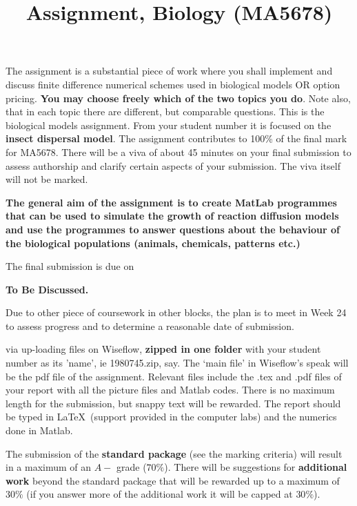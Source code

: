 \documentclass[12pt]{article}
\title{Assignment, Biology (MA5678)}
\begin{document}
\maketitle

\tableofcontents

\vspace{3cm}

The assignment is a substantial piece of work where you shall implement and discuss finite difference numerical schemes
used in biological models OR option pricing. {\bf\darkgreen You may choose freely which of the two topics you do}.
Note also, that in each topic there are different, but comparable questions. This is the biological models assignment.
From your student number it is focused on the {\bf\magenta insect dispersal model}.
The assignment contributes to 100\% of the final mark for MA5678. There will be a viva of about 45 minutes on your final submission
to assess authorship and clarify certain aspects of your submission. The viva itself will not be marked.
\vspace{0.2cm}

{\darkgreen\bf The general aim of the assignment is to create MatLab programmes that can be used to simulate
the growth of reaction diffusion models and use the programmes to answer questions about the behaviour
of the biological populations (animals, chemicals, patterns etc.)}
\vspace{0.2cm}

The final submission is due on
\vspace{0.2cm}

\centerline{\magenta\bf To Be Discussed.}
\vspace{0.2cm}

Due to other piece of coursework in other blocks, the plan is to meet in Week 24 to assess progress and to determine a reasonable date of submission.

\noindent via up-loading files on Wiseflow, {\bf\darkgreen zipped in one folder} with your student number
as its 'name', ie 1980745.zip, say. The `main file' in Wiseflow's speak will be the pdf file of the assignment.
Relevant files include the .tex and .pdf files of your report with all the picture files and Matlab
codes. There is no maximum length for the submission, but snappy text will be rewarded.
The report should be typed in \LaTeX\ (support provided in the computer labs)
and the numerics done in Matlab.

The submission of the {\bf\magenta standard package} (see the marking criteria) will result
in a maximum of an $A-$ grade ($70\%$). There will be suggestions for {\bf\magenta additional work}
beyond the standard package that will be rewarded up to a maximum of $30\%$ (if you answer more of the additional work it will be capped at $30\%$).
\end{document}
